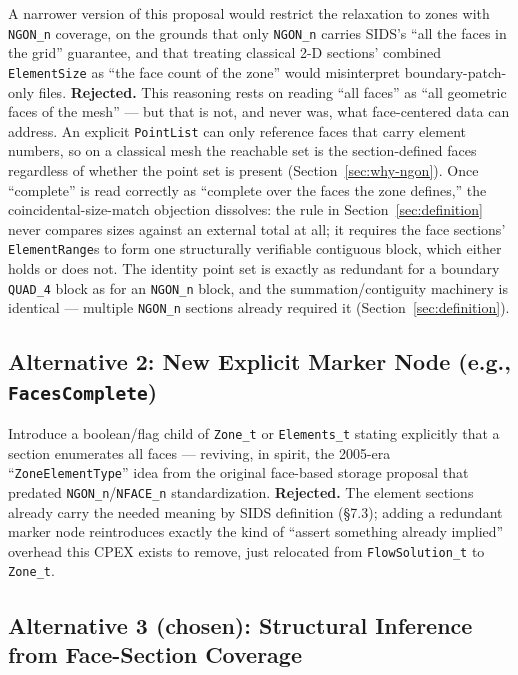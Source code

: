 \documentclass[11pt,letterpaper]{article}
\begin{document}
A narrower version of this proposal would restrict the relaxation to
zones with \texttt{NGON\_n} coverage, on the grounds that only
\texttt{NGON\_n} carries SIDS's ``all the faces in the grid'' guarantee,
and that treating classical 2-D sections' combined \texttt{ElementSize}
as ``the face count of the zone'' would misinterpret boundary-patch-only
files. \textbf{Rejected.} This reasoning rests on reading ``all faces''
as ``all geometric faces of the mesh'' --- but that is not, and never
was, what face-centered data can address. An explicit \texttt{PointList}
can only reference faces that carry element numbers, so on a classical
mesh the reachable set is the section-defined faces regardless of
whether the point set is present (Section~\ref{sec:why-ngon}). Once
``complete'' is read correctly as ``complete over the faces the zone
defines,'' the coincidental-size-match objection dissolves: the rule in
Section~\ref{sec:definition} never compares sizes against an external
total at all; it requires the face sections' \texttt{ElementRange}s to
form one structurally verifiable contiguous block, which either holds or
does not. The identity point set is exactly as redundant for a boundary
\texttt{QUAD\_4} block as for an \texttt{NGON\_n} block, and the
summation/contiguity machinery is identical --- multiple \texttt{NGON\_n}
sections already required it (Section~\ref{sec:definition}).

\subsection{Alternative 2: New Explicit Marker Node (e.g., \texttt{FacesComplete})}

Introduce a boolean/flag child of \texttt{Zone\_t} or \texttt{Elements\_t}
stating explicitly that a section enumerates all faces --- reviving, in
spirit, the 2005-era ``\texttt{ZoneElementType}'' idea from the original
face-based storage proposal that predated \texttt{NGON\_n}/\texttt{NFACE\_n}
standardization. \textbf{Rejected.} The element sections already carry
the needed meaning by SIDS definition (\S7.3); adding a redundant marker
node reintroduces exactly the kind of ``assert something already
implied'' overhead this CPEX exists to remove, just relocated from
\texttt{FlowSolution\_t} to \texttt{Zone\_t}.

\subsection{Alternative 3 (chosen): Structural Inference from Face-Section Coverage}
\end{document}
